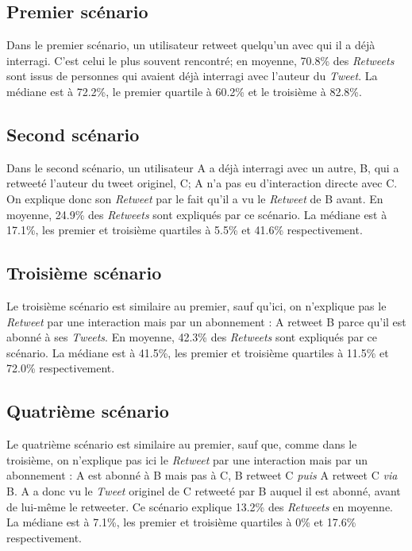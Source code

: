 \documentclass[]{article}
\begin{document}
\subsection{Premier scénario}

Dans le premier scénario, un utilisateur retweet quelqu'un avec qui il a
déjà interragi. C'est celui le plus souvent rencontré; en moyenne,
70.8\% des \emph{Retweets} sont issus de personnes qui avaient déjà 
interragi avec l'auteur du \emph{Tweet}. La médiane est à 72.2\%, le
premier quartile à 60.2\% et le troisième à 82.8\%.

\subsection{Second scénario}

Dans le second scénario, un utilisateur A a déjà interragi avec un
autre, B, qui a retweeté l'auteur du tweet originel, C; A n'a pas eu
d'interaction directe avec C. On explique donc son \emph{Retweet} par le
fait qu'il a vu le \emph{Retweet} de B avant. En moyenne, 24.9\% des
\emph{Retweets} sont expliqués par ce scénario. La médiane est à 17.1\%,
les premier et troisième quartiles à 5.5\% et 41.6\% respectivement.

\subsection{Troisième scénario}

Le troisième scénario est similaire au premier, sauf qu'ici, on
n'explique pas le \emph{Retweet} par une interaction mais par un
abonnement : A retweet B parce qu'il est abonné à ses \emph{Tweets}. En
moyenne, 42.3\% des \emph{Retweets} sont expliqués par ce scénario. La
médiane est à 41.5\%, les premier et troisième quartiles à 11.5\% et
72.0\% respectivement.

\subsection{Quatrième scénario}

Le quatrième scénario est similaire au premier, sauf que, comme dans le
troisième, on n'explique pas ici le \emph{Retweet} par une interaction
mais par un abonnement : A est abonné à B mais pas à C, B retweet C
\emph{puis} A retweet C \emph{via} B. A a donc vu le \emph{Tweet}
originel de C retweeté par B auquel il est abonné, avant de lui-même le
retweeter. Ce scénario explique 13.2\% des \emph{Retweets} en moyenne.
La médiane est à 7.1\%, les premier et troisième quartiles à 0\% et
17.6\% respectivement.
\end{document}
